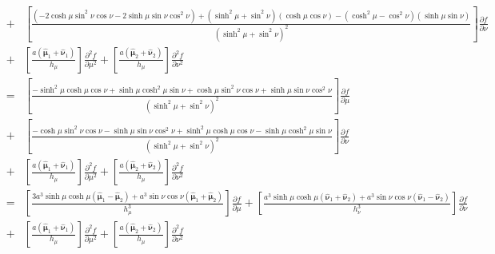 \documentclass[11pt,a4paper]{article}
\begin{document}
\[\begin{array}{rcl}
&+&\left[\frac{(-2\cosh\mu\sin^2\nu\cos\nu-2\sinh\mu\sin\nu\cos^2\nu)+(\sinh^2\mu+\sin^2\nu)(\cosh\mu\cos\nu)-(\cosh^2\mu-\cos^2\nu)(\sinh\mu\sin\nu)}{(\sinh^2\mu+\sin^2\nu)^2}\right]\frac{\partial f}{\partial\nu}\\
&+&\left[\frac{a(\hat{\pmb{\mu}}_1+\hat{\pmb{\nu}}_1)}{h_\mu}\right]\frac{\partial^2 f}{\partial\mu^2}+\left[\frac{a(\hat{\pmb{\mu}}_2+\hat{\pmb{\nu}}_2)}{h_\mu}\right]\frac{\partial^2 f}{\partial\nu^2}\\
&=&\left[\frac{-\sinh^2\mu\cosh\mu\cos\nu+\sinh\mu\cosh^2\mu\sin\nu+\cosh\mu\sin^2\nu\cos\nu+\sinh\mu\sin\nu\cos^2\nu}{(\sinh^2\mu+\sin^2\nu)^2}\right]\frac{\partial f}{\partial\mu}\\
&+&\left[\frac{-\cosh\mu\sin^2\nu\cos\nu-\sinh\mu\sin\nu\cos^2\nu+\sinh^2\mu\cosh\mu\cos\nu-\sinh\mu\cosh^2\mu\sin\nu}{(\sinh^2\mu+\sin^2\nu)^2}\right]\frac{\partial f}{\partial\nu}\\
&+&\left[\frac{a(\hat{\pmb{\mu}}_1+\hat{\pmb{\nu}}_1)}{h_\mu}\right]\frac{\partial^2 f}{\partial\mu^2}+\left[\frac{a(\hat{\pmb{\mu}}_2+\hat{\pmb{\nu}}_2)}{h_\mu}\right]\frac{\partial^2 f}{\partial\nu^2}\\
&=&\left[\frac{3a^3\sinh\mu\cosh\mu(\hat{\pmb{\mu}}_1-\hat{\pmb{\mu}}_2)+a^3\sin\nu\cos\nu(\hat{\pmb{\mu}}_1+\hat{\pmb{\mu}}_2)}{h_\mu^3}\right]\frac{\partial f}{\partial\mu}
+\left[\frac{a^3\sinh\mu\cosh\mu(\hat{\pmb{\nu}}_1+\hat{\pmb{\nu}}_2)+a^3\sin\nu\cos\nu(\hat{\pmb{\nu}}_1-\hat{\pmb{\nu}}_2)}{h_\nu^3}\right]\frac{\partial f}{\partial\nu}\\
&+&\left[\frac{a(\hat{\pmb{\mu}}_1+\hat{\pmb{\nu}}_1)}{h_\mu}\right]\frac{\partial^2 f}{\partial\mu^2}+\left[\frac{a(\hat{\pmb{\mu}}_2+\hat{\pmb{\nu}}_2)}{h_\mu}\right]\frac{\partial^2 f}{\partial\nu^2}\\
\end{array}\]
\end{document}

